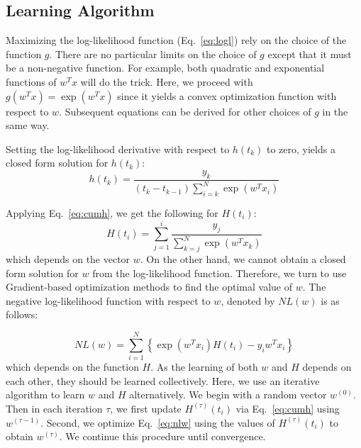 \subsection{Learning Algorithm}
Maximizing the log-likelihood function (Eq.~\ref{eq:logl}) rely on the choice of the function $g$. There are no particular limits on the choice of $g$ except that it must be a non-negative function. For example, both quadratic and exponential functions of $w^Tx$ will do the trick. Here, we proceed with $g(w^Tx)=\exp(w^Tx)$ since it yields a convex optimization function with respect to $w$. Subsequent equations can be derived for other choices of $g$ in the same way.

Setting the log-likelihood derivative with respect to $h(t_k)$ to zero, yields a closed form solution for $h(t_k)$:
\begin{equation}
h(t_k)=\frac{y_k}{(t_k-t_{k-1})\sum_{i=k}^{N}\exp(w^Tx_i)}
\end{equation}

Applying Eq.~\ref{eq:cumh}, we get the following for $H(t_i)$:
\begin{equation}
H(t_i)=\sum_{j=1}^{i}\frac{y_j}{\sum_{k=j}^{N}\exp(w^Tx_k)}
\end{equation}
which depends on the vector $w$. On the other hand, we cannot obtain a closed form solution for $w$ from the log-likelihood function. Therefore, we turn to use Gradient-based optimization methods to find the optimal value of $w$. The negative log-likelihood function with respect to $w$, denoted by $NL(w)$ is as follows:

\begin{equation}\label{eq:nlw}
NL(w)=\sum_{i=1}^{N}\left\lbrace\exp(w^Tx_i)H(t_i)-y_iw^Tx_i\right\rbrace
\end{equation}
which depends on the function $H$. As the learning of both $w$ and $H$ depends on each other, they should be learned collectively. Here, we use an iterative algorithm to learn $w$ and $H$ alternatively. We begin with a random vector $w^{(0)}$. Then in each iteration $\tau$, we first update $H^{(\tau)}(t_i)$ via Eq.~\ref{eq:cumh} using $w^{(\tau-1)}$. Second, we optimize Eq.~\ref{eq:nlw} using the values of $H^{(\tau)}(t_i)$ to obtain $w^{(\tau)}$. We continue this procedure until convergence.


